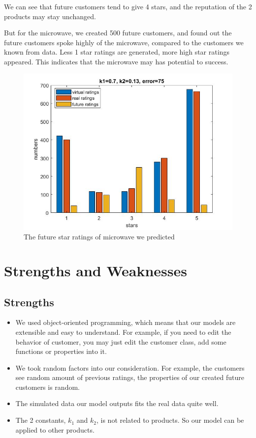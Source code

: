 \documentclass[12pt]{article}  %
\begin{document}
We can see that future customers tend to give 4 stars, and the reputation of the 2 products may stay unchanged.

But for the microwave, we created 500 future customers, and found out the future customers spoke highly of the microwave, compared to the customers we known from data. Less 1 star ratings are generated, more high star ratings appeared. This indicates that the microwave may has potential to success.
\begin{figure}[H]
  \centering
  \includegraphics[width=0.7\linewidth]{Q3picture/microwave.jpg}
  \caption{The future star ratings of microwave we predicted}
  \label{fig:}
\end{figure}



\section{Strengths and Weaknesses}
\subsection{Strengths}
\begin{itemize}
\item We used object-oriented programming, which means that our models are extensible and easy to understand. For example, if you need to edit the behavior of customer, you may just edit the customer class, add some functions or properties into it.
  \item We took random factors into our consideration. For example, the customers see random amount of previous ratings, the properties of our created future customers is random.
  \item The simulated data our model outputs fits the real data quite well.
    \item The 2 constants, $k_1$ and $k_{2}$, is not related to products. So our model can be applied to other products.
\end{itemize}
\end{document}

